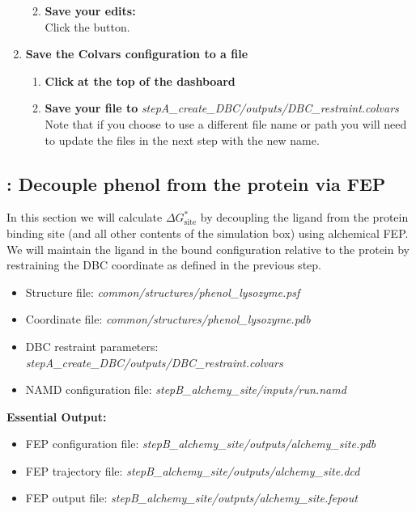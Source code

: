 \documentclass[9pt,tutorial]{Styling/livecoms}
\newcommand{\filepath}[1]{\textit{#1}}
\newcommand{\button}[1]{\inlineBox[gray]{\texttt{#1}}}
\begin{document}
\begin{enumerate}
\begin{enumerate}[label=\alph*., ref=\theenumi.\alph*]
\begin{itemize}
            \end{itemize}
            \item \textbf{Save your edits:}\\
            Click the \button{Apply [Ctrl-s]} button.
        \end{enumerate}
        \item \textbf{Save the Colvars configuration to a file}
        \begin{enumerate}[label=\alph*., ref=\theenumi.\alph*]
            \item \textbf{Click} \button{Save} \textbf{at the top of the dashboard}
            \item \textbf{Save your file to} \filepath{stepA\_create\_DBC/outputs/DBC\_restraint.colvars}\\
            Note that if you choose to use a different file name or path you will need to update the files in the next step with the new name.
        \end{enumerate}
    \end{enumerate}

\subsection{\hspace{-1em}: Decouple phenol from the protein via FEP}\label{step:proteinDecouple}
    \begin{tcolorbox}[colback=blue!5!white,colframe=blue!75!black]
    In this section we will calculate $\Delta G_\mathrm{site}^*$ by decoupling the ligand from the protein binding site (and all other contents of the simulation box) using alchemical FEP.
    We will maintain the ligand in the bound configuration relative to the protein by restraining the DBC coordinate as defined in the previous step.
    \end{tcolorbox}
    
    \begin{itemize}
        \item Structure file: \filepath{common/structures/phenol\_lysozyme.psf} 
        \item Coordinate file: \filepath{common/structures/phenol\_lysozyme.pdb}
        \item DBC restraint parameters: \filepath{stepA\_create\_DBC/outputs/DBC\_restraint.colvars}
        \item NAMD configuration file: \filepath{stepB\_alchemy\_site/inputs/run.namd}
    \end{itemize}
    \textbf{Essential Output:}
    \begin{itemize}
        \item FEP configuration file: \filepath{stepB\_alchemy\_site/outputs/alchemy\_site.pdb}
        \item FEP trajectory file: \filepath{stepB\_alchemy\_site/outputs/alchemy\_site.dcd}
        \item FEP output file: \filepath{stepB\_alchemy\_site/outputs/alchemy\_site.fepout}
    \end{itemize}
    
\end{document}
